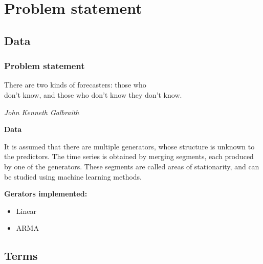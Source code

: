 \documentclass{beamer}
\begin{document}
\section{Problem statement} 
\subsection{Data} 

\begin{frame}
\frametitle{Problem statement}

\epigraph{There are two kinds of forecasters: those who \\ don’t know, and those who don’t know they don’t know.}{\textit{John Kenneth Galbraith}}

\textbf{Data}

It is assumed that there are multiple generators, whose structure is unknown to the predictors. 
The time series is obtained by merging segments, each produced by one of the generators. 
These segments are called areas of stationarity, and can be studied using machine learning methods. 

\bigskip
\textbf{Gerators implemented:}
\begin{itemize}
\item Linear 
\item ARMA
\end{itemize}




\end{frame}


\subsection{Terms} 
\end{document}
